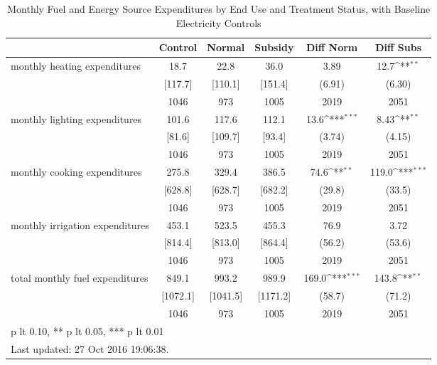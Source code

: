 \begin{table}[htbp]\centering
\def\sym#1{\ifmmode^{#1}\else\(^{#1}\)\fi}
\caption{Monthly Fuel and Energy Source Expenditures by End Use and Treatment Status, with Baseline Electricity Controls \label{tab:"balance"}}
\begin{tabular*}{0.9\hsize}{@{\hskip\tabcolsep\extracolsep\fill}l*{1}{ccccc}}
\toprule
                                &  Control&   Normal&  Subsidy&Diff Norm         &Diff Subs         \\
\midrule
monthly heating expenditures    &     18.7&     22.8&     36.0&     3.89         &     12.7\sym{**} \\
                                &  [117.7]&  [110.1]&  [151.4]&   (6.91)         &   (6.30)         \\
                                &     1046&      973&     1005&     2019         &     2051         \\
monthly lighting expenditures   &    101.6&    117.6&    112.1&     13.6\sym{***}&     8.43\sym{**} \\
                                &   [81.6]&  [109.7]&   [93.4]&   (3.74)         &   (4.15)         \\
                                &     1046&      973&     1005&     2019         &     2051         \\
monthly cooking expenditures    &    275.8&    329.4&    386.5&     74.6\sym{**} &    119.0\sym{***}\\
                                &  [628.8]&  [628.7]&  [682.2]&   (29.8)         &   (33.5)         \\
                                &     1046&      973&     1005&     2019         &     2051         \\
monthly irrigation expenditures &    453.1&    523.5&    455.3&     76.9         &     3.72         \\
                                &  [814.4]&  [813.0]&  [864.4]&   (56.2)         &   (53.6)         \\
                                &     1046&      973&     1005&     2019         &     2051         \\
total monthly fuel expenditures &    849.1&    993.2&    989.9&    169.0\sym{***}&    143.8\sym{**} \\
                                & [1072.1]& [1041.5]& [1171.2]&   (58.7)         &   (71.2)         \\
                                &     1046&      973&     1005&     2019         &     2051         \\
\bottomrule
\multicolumn{6}{l}{\footnotesize * p lt 0.10, ** p lt 0.05, *** p lt 0.01}\\
\multicolumn{6}{l}{\footnotesize Last updated: 27 Oct 2016 19:06:38.}\\
\end{tabular*}
\end{table}
